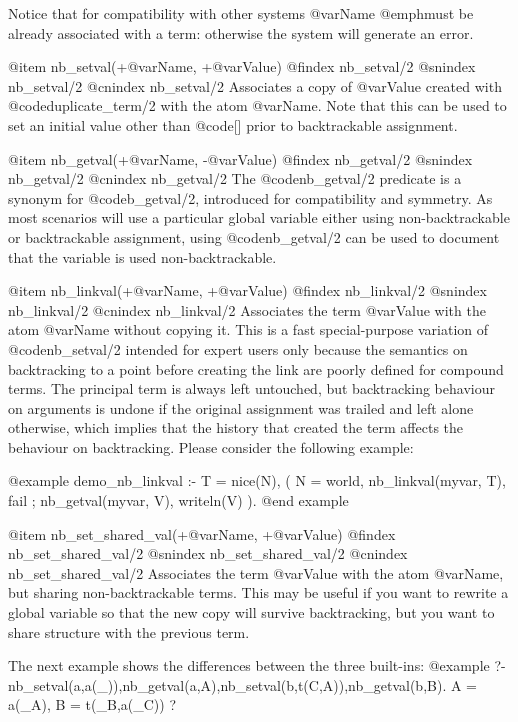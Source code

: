 {{{{{Notice that for compatibility with other systems @var{Name} @emph{must} be already associated with a term: otherwise the system will generate an error.

@item nb_setval(+@var{Name}, +@var{Value}) 
@findex nb_setval/2
@snindex nb_setval/2
@cnindex nb_setval/2
Associates a copy of @var{Value} created with @code{duplicate_term/2} with
the atom @var{Name}. Note that this can be used to set an initial
value other than @code{[]} prior to backtrackable assignment.

@item nb_getval(+@var{Name}, -@var{Value}) 
@findex nb_getval/2
@snindex nb_getval/2
@cnindex nb_getval/2
The @code{nb_getval/2} predicate is a synonym for @code{b_getval/2},
introduced for compatibility and symmetry. As most scenarios will use
a particular global variable either using non-backtrackable or
backtrackable assignment, using @code{nb_getval/2} can be used to
document that the variable is used non-backtrackable.

@item nb_linkval(+@var{Name}, +@var{Value}) 
@findex nb_linkval/2
@snindex nb_linkval/2
@cnindex nb_linkval/2
Associates the term @var{Value} with the atom @var{Name} without
copying it. This is a fast special-purpose variation of @code{nb_setval/2}
intended for expert users only because the semantics on backtracking
to a point before creating the link are poorly defined for compound
terms. The principal term is always left untouched, but backtracking
behaviour on arguments is undone if the original assignment was
trailed and left alone otherwise, which implies that the history that
created the term affects the behaviour on backtracking. Please
consider the following example:

@example
demo_nb_linkval :-
        T = nice(N),
        (   N = world,
            nb_linkval(myvar, T),
            fail
        ;   nb_getval(myvar, V),
            writeln(V)
        ).
@end example

@item nb_set_shared_val(+@var{Name}, +@var{Value}) 
@findex nb_set_shared_val/2
@snindex nb_set_shared_val/2
@cnindex nb_set_shared_val/2
Associates the term @var{Value} with the atom @var{Name}, but sharing
non-backtrackable terms. This may be useful if you want to rewrite a
global variable so that the new copy will survive backtracking, but
you want to share structure with the previous term.

The next example shows the differences between the three built-ins:
@example
?- nb_setval(a,a(_)),nb_getval(a,A),nb_setval(b,t(C,A)),nb_getval(b,B).
A = a(_A),
B = t(_B,a(_C)) ? 

}}}}}
